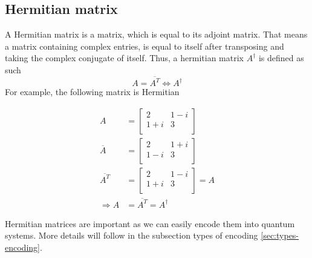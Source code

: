 \subsection{Hermitian matrix}
A Hermitian matrix is a matrix, which is equal to its adjoint matrix. 
That means a matrix containing complex entries, is equal to itself after transposing and taking the complex conjugate of itself. 
Thus, a hermitian matrix $A^\dagger$ is defined as such
\begin{equation}
 A = \overline{A^T} \Leftrightarrow A^\dagger
\end{equation}
For example, the following matrix is Hermitian





\begin{equation}
\begin{split}
A &= \begin{bmatrix} 2 & 1-i \\ 1+i & 3 \\ \end{bmatrix} \\
\overline A &= \begin{bmatrix} 2 & 1+i \\ 1-i & 3 \\ \end{bmatrix}\\
\overline{A^T} &= \begin{bmatrix} 2 & 1-i \\ 1+i & 3 \\ \end{bmatrix} = A\\
\Rightarrow A &= \overline{A^T} = A^\dagger
\end{split}
\end{equation}

Hermitian matrices are important as we can easily encode them into quantum systems.
More details will follow in the subsection types of encoding \ref{sec:types-encoding}.


